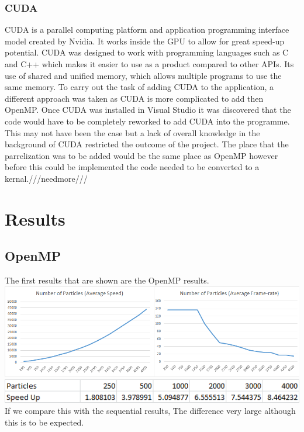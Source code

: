 \documentclass[12pt]{article}
\begin{document}
\subsubsection{CUDA}
CUDA is a  parallel computing platform and application programming interface model created by Nvidia. It works inside the GPU to allow for great speed-up potential. CUDA was designed to work with programming languages such as C and C++ which makes it easier to use as a product compared to other APIs. Its use of shared and unified memory, which allows multiple programs to use the same memory.
\newline
 To carry out the task of adding CUDA to the application, a different approach was taken as CUDA is more complicated to add then OpenMP. Once CUDA was installed in Visual Studio it was discovered that the code would have to be completely reworked to add CUDA into the programme. This may not have been the case but a lack of overall knowledge in the background of CUDA restricted the outcome of the project.
 \newline 
 The place that the parrelization was to be added would be the same place as OpenMP however before this could be implemented the code needed to be converted to a kernal.///needmore///

\section{Results}
\subsection{OpenMP}
The first results that are shown are the OpenMP results.
\newline
\includegraphics[scale=0.5]{pics/optest.png}
\newline
\includegraphics[scale=0.7]{pics/opspeedup.png}
\newline
If we compare this with the sequential results, The difference very large although this is to be expected.  
\end{document}
